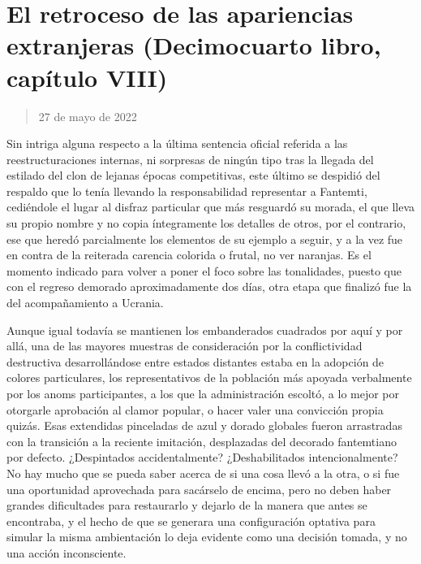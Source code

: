\documentclass[
]{book}
\begin{document}
\hypertarget{el-retroceso-de-las-apariencias-extranjeras-decimocuarto-libro-capuxedtulo-viii}{%
\section{El retroceso de las apariencias extranjeras (Decimocuarto libro, capítulo VIII)}\label{el-retroceso-de-las-apariencias-extranjeras-decimocuarto-libro-capuxedtulo-viii}}

\begin{quote}
27 de mayo de 2022
\end{quote}

Sin intriga alguna respecto a la última sentencia oficial referida a las reestructuraciones internas, ni sorpresas de ningún tipo tras la llegada del estilado del clon de lejanas épocas competitivas, este último se despidió del respaldo que lo tenía llevando la responsabilidad representar a Fantemti, cediéndole el lugar al disfraz particular que más resguardó su morada, el que lleva su propio nombre y no copia íntegramente los detalles de otros, por el contrario, ese que heredó parcialmente los elementos de su ejemplo a seguir, y a la vez fue en contra de la reiterada carencia colorida o frutal, no ver naranjas. Es el momento indicado para volver a poner el foco sobre las tonalidades, puesto que con el regreso demorado aproximadamente dos días, otra etapa que finalizó fue la del acompañamiento a Ucrania.

Aunque igual todavía se mantienen los embanderados cuadrados por aquí y por allá, una de las mayores muestras de consideración por la conflictividad destructiva desarrollándose entre estados distantes estaba en la adopción de colores particulares, los representativos de la población más apoyada verbalmente por los anoms participantes, a los que la administración escoltó, a lo mejor por otorgarle aprobación al clamor popular, o hacer valer una convicción propia quizás. Esas extendidas pinceladas de azul y dorado globales fueron arrastradas con la transición a la reciente imitación, desplazadas del decorado fantemtiano por defecto. ¿Despintados accidentalmente? ¿Deshabilitados intencionalmente? No hay mucho que se pueda saber acerca de si una cosa llevó a la otra, o si fue una oportunidad aprovechada para sacárselo de encima, pero no deben haber grandes dificultades para restaurarlo y dejarlo de la manera que antes se encontraba, y el hecho de que se generara una configuración optativa para simular la misma ambientación lo deja evidente como una decisión tomada, y no una acción inconsciente.
\end{document}
